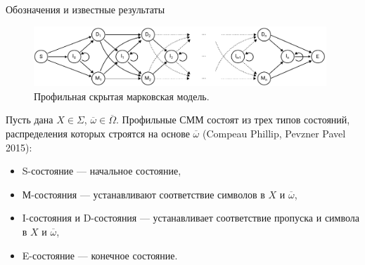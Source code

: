 \documentclass[ucs, notheorems, handout, 10pt]{beamer}
\begin{document}
	\begin{frame}{Обозначения и известные результаты}				
		\begin{figure}[h]
			\includegraphics[width=11cm]{../../report/figure2}
			\caption{Профильная скрытая марковская модель.}  \label{fg:3}
		\end{figure}	
		
		Пусть дана $X \in \Sigma$, $\overline{\omega} \in \overline{\Omega}$. Профильные СММ состоят из трех типов состояний, распределения которых строятся на основе $\overline{\omega}$ (Compeau Phillip, Pevzner Pavel 2015):
		\begin{itemize}
			\item S-состояние --- начальное состояние,
			\item М-состояния --- устанавливают соответствие символов в $X$ и $\overline{\omega}$,
			\item I-состояния и D-состояния --- устанавливает соответствие пропуска и символа в $X$ и $\overline{\omega}$,
			\item E-состояние --- конечное состояние.
		\end{itemize}
		
	\end{frame}
\end{document}
